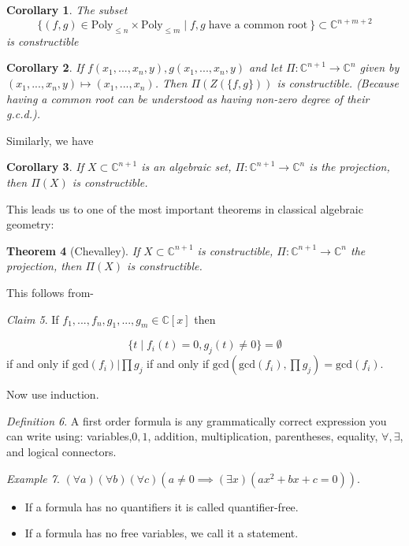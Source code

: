 \documentclass[12pt]{article}
\newtheorem{theorem}{Theorem}[section]
\newtheorem{corollary}[theorem]{Corollary}
\theoremstyle{remark}
\newtheorem{definition}[theorem]{Definition}
\newtheorem{example}[theorem]{Example}
\newtheorem{claim}[theorem]{Claim}
\newcommand{\C}{\mathbb{C}}
\begin{document}
\begin{corollary}
The subset  
$$ \{(f,g) \in \text{Poly}_{\leq n} \times \text{Poly}_{\leq m} \; | \; f,g \; \text{have a common root} \: \} \subset \C^{n+m+2}$$
is constructible
\end{corollary}

\begin{corollary}
If $f(x_1,...,x_n,y) , g(x_1,...,x_n,y)$ and let $\Pi: \C^{n+1} \rightarrow \C^n$ given by $(x_1,...,x_n,y) \mapsto (x_1,...,x_n)$. Then $\Pi(Z(\{f , g \}))$ is constructible. (Because having a common root can be understood as having non-zero degree of their g.c.d.).
\end{corollary}

Similarly, we have 

\begin{corollary}
If $X \subset \C^{n+1}$ is an algebraic set, $\Pi: \C^{n+1} \rightarrow \C^n$ is the projection, then $\Pi(X)$ is constructible.
\end{corollary}

This leads us to one of the most important theorems in classical algebraic geometry:

\begin{theorem}[Chevalley]
If $X \subset \C^{n+1}$ is constructible, $\Pi: \C^{n+1} \rightarrow \C^n$ the projection, then $\Pi(X)$ is constructible.
\end{theorem}

This follows from- 

\begin{claim}
If $f_1,...,f_n, g_1,...,g_m \in \C[x]$ then 

$$\{t \; | \; f_i(t) = 0 , g_j(t) \neq 0 \} = \emptyset $$ if and only if $\text{gcd}(f_i) | \prod g_j $ if and only if $\text{gcd}(\text{gcd}(f_i), \prod g_j) = \text{gcd}(f_i)$.
\end{claim}

Now use induction. \\

\begin{definition}
A first order formula is any grammatically correct expression you can write using: variables,$0,1$, addition, multiplication, parentheses, equality, $\forall, \exists$, and logical connectors.
\end{definition}
\begin{example}
$(\forall a) (\forall b) (\forall c) ( a \neq 0 \implies (\exists x ) (ax^2+bx+c = 0 ))$.
\end{example}
\begin{itemize}
\item If a formula has no quantifiers it is called quantifier-free. 
\item If a formula has no free variables, we call it a statement.

\end{itemize}
\end{document}
